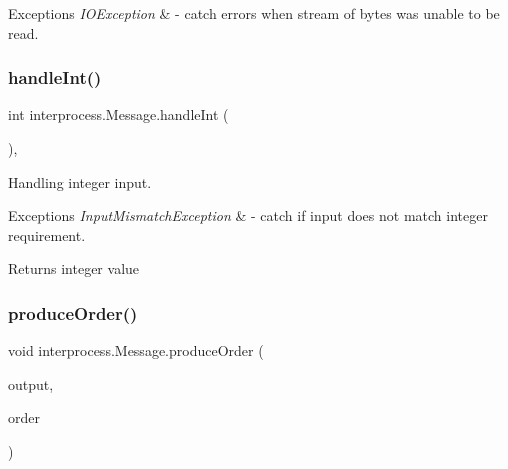 \begin{DoxyExceptions}{Exceptions}
{\em I\+O\+Exception} & -\/ catch errors when stream of bytes was unable to be read. \\
\hline
\end{DoxyExceptions}
\mbox{\label{classinterprocess_1_1_message_a594aec63ced8dc0b7440ceae46e71c52}} 
\subsubsection{\texorpdfstring{handle\+Int()}{handleInt()}}
{\footnotesize\ttfamily int interprocess.\+Message.\+handle\+Int (\begin{DoxyParamCaption}{ }\end{DoxyParamCaption})\hspace{0.3cm}{\ttfamily [inline]}, {\ttfamily [private]}}

Handling integer input. 
\begin{DoxyExceptions}{Exceptions}
{\em Input\+Mismatch\+Exception} & -\/ catch if input does not match integer requirement. \\
\hline
\end{DoxyExceptions}
\begin{DoxyReturn}{Returns}
integer value 
\end{DoxyReturn}
\mbox{\label{classinterprocess_1_1_message_a753fc2d9bffff59d32d9a20512ac6639}} 
\subsubsection{\texorpdfstring{produce\+Order()}{produceOrder()}}
{\footnotesize\ttfamily void interprocess.\+Message.\+produce\+Order (\begin{DoxyParamCaption}\item[{Piped\+Output\+Stream}]{output,  }\item[{List$<$ \hyperlink{classinterprocess_1_1_order}{Order} $>$}]{order }\end{DoxyParamCaption})\hspace{0.3cm}{\ttfamily [inline]}}

